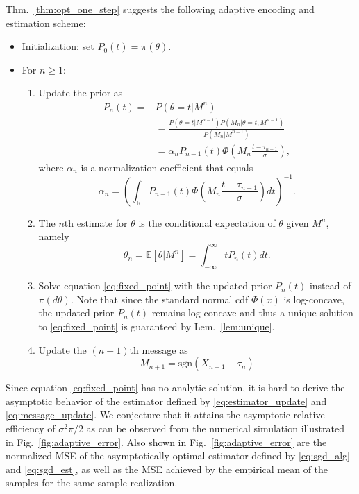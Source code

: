 \documentclass[letterpaper, conference,9pt]{IEEEtran}      %
\newcommand{\sgn}{\mathrm{sgn} }
\begin{document}
Thm.~\ref{thm:opt_one_step} suggests the following adaptive encoding and estimation scheme: 
\begin{itemize}
\item Initialization: set $P_0(t) = \pi(\theta)$.
\item For $n\geq 1$:
\begin{enumerate}
\item Update the prior as
\begin{align}
P_n(t) = & P(\theta=t |M^n) \\
& = \frac{ P\left( \theta=t | M^{n-1} \right) P(M_n | \theta = t , M^{n-1})  } { P(M_n | M^{n-1} )} \nonumber \\ 
& = \alpha_n  P_{n-1}(t) \Phi\left(M_n \frac{ t - \tau_{n-1} }{\sigma} \right), \label{eq:density_update}
\end{align}
where $\alpha_n$ is a normalization coefficient that equals
\[
\alpha_n = \left(\int_{\mathbb R} P_{n-1}(t) \Phi\left(M_n \frac{t- \tau_{n-1} }{\sigma} \right)  dt \right)^{-1}. 
\]
\item The $n$th estimate for $\theta$ is the conditional expectation of $\theta$ given $M^n$, namely
\begin{equation}
\theta_n = \mathbb E \left[ \theta| M^n\right] = \int_{-\infty}^\infty t P_n(t) dt. \label{eq:estimator_update}
\end{equation}
\item Solve equation \eqref{eq:fixed_point} with the updated prior $P_n(t)$ instead of $\pi(d\theta)$. Note that since the standard normal cdf $\Phi(x)$ is log-concave, the updated prior $P_n(t)$ remains log-concave and thus a unique solution to \eqref{eq:fixed_point} is guaranteed by Lem.~\ref{lem:unique}. 
\item Update the $(n+1)$th message as
\begin{equation}\label{eq:message_update}
M_{n+1} = \sgn(X_{n+1}-\tau_n)
\end{equation}
\end{enumerate}
\end{itemize}
Since equation \eqref{eq:fixed_point} has no analytic solution, it is hard to derive the asymptotic behavior of the estimator defined by \eqref{eq:estimator_update} and \eqref{eq:message_update}. We conjecture that it attains the asymptotic relative efficiency of $\sigma^2\pi/2$ as can be observed from the numerical simulation illustrated in Fig.~\ref{fig:adaptive_error}. Also shown in Fig.~\ref{fig:adaptive_error} are the normalized MSE of the asymptotically optimal estimator defined by \eqref{eq:sgd_alg} and \eqref{eq:sgd_est}, as well as the MSE achieved by the empirical mean of the samples for the same sample realization.
\end{document}
